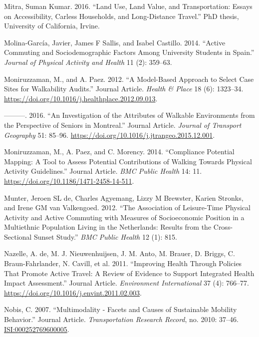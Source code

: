 \documentclass[]{elsarticle} %
\begin{document}
\leavevmode\hypertarget{ref-mitra2016}{}%
Mitra, Suman Kumar. 2016. ``Land Use, Land Value, and Transportation:
Essays on Accessibility, Carless Households, and Long-Distance Travel.''
PhD thesis, University of California, Irvine.

\leavevmode\hypertarget{ref-molina2014active}{}%
Molina-García, Javier, James F Sallis, and Isabel Castillo. 2014.
``Active Commuting and Sociodemographic Factors Among University
Students in Spain.'' \emph{Journal of Physical Activity and Health} 11
(2): 359--63.

\leavevmode\hypertarget{ref-Moniruzzaman2012model}{}%
Moniruzzaman, M., and A. Paez. 2012. ``A Model-Based Approach to Select
Case Sites for Walkability Audits.'' Journal Article. \emph{Health \&
Place} 18 (6): 1323--34.
\url{https://doi.org/10.1016/j.healthplace.2012.09.013}.

\leavevmode\hypertarget{ref-Moniruzzaman2016investigation}{}%
---------. 2016. ``An Investigation of the Attributes of Walkable
Environments from the Perspective of Seniors in Montreal.'' Journal
Article. \emph{Journal of Transport Geography} 51: 85--96.
\url{https://doi.org/10.1016/j.jtrangeo.2015.12.001}.

\leavevmode\hypertarget{ref-Moniruzzaman2014compliance}{}%
Moniruzzaman, M., A. Paez, and C. Morency. 2014. ``Compliance Potential
Mapping: A Tool to Assess Potential Contributions of Walking Towards
Physical Activity Guidelines.'' Journal Article. \emph{BMC Public
Health} 14: 11. \url{https://doi.org/10.1186/1471-2458-14-511}.

\leavevmode\hypertarget{ref-de2012association}{}%
Munter, Jeroen SL de, Charles Agyemang, Lizzy M Brewster, Karien
Stronks, and Irene GM van Valkengoed. 2012. ``The Association of
Leisure-Time Physical Activity and Active Commuting with Measures of
Socioeconomic Position in a Multiethnic Population Living in the
Netherlands: Results from the Cross-Sectional Sunset Study.'' \emph{BMC
Public Health} 12 (1): 815.

\leavevmode\hypertarget{ref-deNazelle2011improving}{}%
Nazelle, A. de, M. J. Nieuwenhuijsen, J. M. Anto, M. Brauer, D. Briggs,
C. Braun-Fahrlander, N. Cavill, et al. 2011. ``Improving Health Through
Policies That Promote Active Travel: A Review of Evidence to Support
Integrated Health Impact Assessment.'' Journal Article.
\emph{Environment International} 37 (4): 766--77.
\url{https://doi.org/10.1016/j.envint.2011.02.003}.

\leavevmode\hypertarget{ref-Nobis2007multimodality}{}%
Nobis, C. 2007. ``Multimodality - Facets and Causes of Sustainable
Mobility Behavior.'' Journal Article. \emph{Transportation Research
Record}, no. 2010: 37--46. \url{ISI:000252769600005}.
\end{document}
